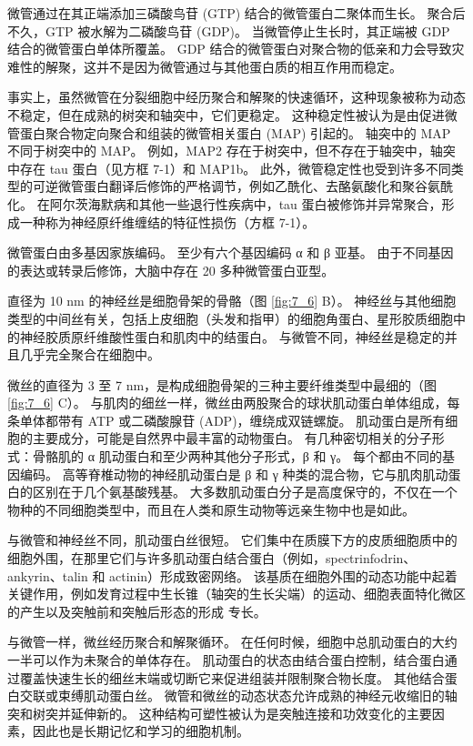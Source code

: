 微管通过在其正端添加三磷酸鸟苷 (GTP) 结合的微管蛋白二聚体而生长。 
聚合后不久，GTP 被水解为二磷酸鸟苷 (GDP)。 
当微管停止生长时，其正端被 GDP 结合的微管蛋白单体所覆盖。 
GDP 结合的微管蛋白对聚合物的低亲和力会导致灾难性的解聚，这并不是因为微管通过与其他蛋白质的相互作用而稳定。


事实上，虽然微管在分裂细胞中经历聚合和解聚的快速循环，这种现象被称为动态不稳定，但在成熟的树突和轴突中，它们更稳定。 
这种稳定性被认为是由促进微管蛋白聚合物定向聚合和组装的微管相关蛋白 (MAP) 引起的。 
轴突中的 MAP 不同于树突中的 MAP。 
例如，MAP2 存在于树突中，但不存在于轴突中，轴突中存在 tau 蛋白（见方框 7-1）和 MAP1b。 
此外，微管稳定性也受到许多不同类型的可逆微管蛋白翻译后修饰的严格调节，例如乙酰化、去酪氨酸化和聚谷氨酰化。 
在阿尔茨海默病和其他一些退行性疾病中，tau 蛋白被修饰并异常聚合，形成一种称为神经原纤维缠结的特征性损伤（方框 7-1）。


微管蛋白由多基因家族编码。 
至少有六个基因编码 α 和 β 亚基。 
由于不同基因的表达或转录后修饰，大脑中存在 20 多种微管蛋白亚型。


直径为 10 nm 的神经丝是细胞骨架的骨骼（图 \ref{fig:7_6} B）。 
神经丝与其他细胞类型的中间丝有关，包括上皮细胞（头发和指甲）的细胞角蛋白、星形胶质细胞中的神经胶质原纤维酸性蛋白和肌肉中的结蛋白。 
与微管不同，神经丝是稳定的并且几乎完全聚合在细胞中。


微丝的直径为 3 至 7 nm，是构成细胞骨架的三种主要纤维类型中最细的（图 \ref{fig:7_6} C）。 
与肌肉的细丝一样，微丝由两股聚合的球状肌动蛋白单体组成，每条单体都带有 ATP 或二磷酸腺苷 (ADP)，缠绕成双链螺旋。 
肌动蛋白是所有细胞的主要成分，可能是自然界中最丰富的动物蛋白。 
有几种密切相关的分子形式：骨骼肌的 α 肌动蛋白和至少两种其他分子形式，β 和 γ。 
每个都由不同的基因编码。 
高等脊椎动物的神经肌动蛋白是 β 和 γ 种类的混合物，它与肌肉肌动蛋白的区别在于几个氨基酸残基。 
大多数肌动蛋白分子是高度保守的，不仅在一个物种的不同细胞类型中，而且在人类和原生动物等远亲生物中也是如此。


与微管和神经丝不同，肌动蛋白丝很短。 
它们集中在质膜下方的皮质细胞质中的细胞外围，在那里它们与许多肌动蛋白结合蛋白（例如，spectrinfodrin、ankyrin、talin 和 actinin）形成致密网络。 
该基质在细胞外围的动态功能中起着关键作用，例如发育过程中生长锥（轴突的生长尖端）的运动、细胞表面特化微区的产生以及突触前和突触后形态的形成 专长。


与微管一样，微丝经历聚合和解聚循环。 
在任何时候，细胞中总肌动蛋白的大约一半可以作为未聚合的单体存在。 
肌动蛋白的状态由结合蛋白控制，结合蛋白通过覆盖快速生长的细丝末端或切断它来促进组装并限制聚合物长度。 
其他结合蛋白交联或束缚肌动蛋白丝。 
微管和微丝的动态状态允许成熟的神经元收缩旧的轴突和树突并延伸新的。
这种结构可塑性被认为是突触连接和功效变化的主要因素，因此也是长期记忆和学习的细胞机制。




